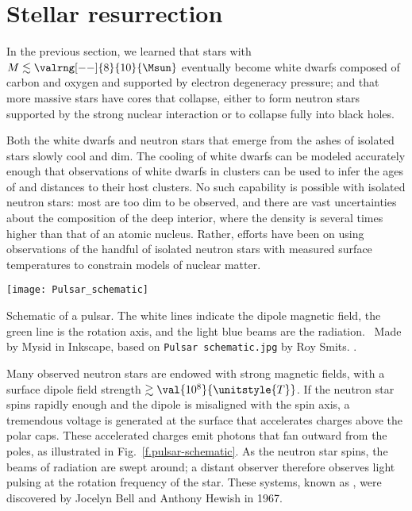 \section{Stellar resurrection}
\label{s.stellar-resurrection}

In the previous section, we learned that stars with $M\lesssim\valrng[--]{8}{10}{\Msun}$ eventually become white dwarfs composed of carbon and oxygen and supported by electron degeneracy pressure; and that more massive stars have cores that collapse, either to form neutron stars supported by the strong nuclear interaction or to collapse fully into black holes.

Both the white dwarfs and neutron stars that emerge from the ashes of isolated stars slowly cool and dim. The cooling of white dwarfs can be modeled accurately enough that observations of white dwarfs in clusters can be used to infer the ages of and distances to their host clusters. No such capability is possible with isolated neutron stars: most are too dim to be observed, and there are vast uncertainties about the composition of the deep interior, where the density is several times higher than that of an atomic nucleus. Rather, efforts have been on using observations of the handful of isolated neutron stars with measured surface temperatures to constrain models of nuclear matter.

\begin{marginfigure}[-10\baselineskip]
\texttt{[image: Pulsar\_schematic]}
\caption[Schematic of a pulsar]{\label{f.pulsar-schematic}
Schematic of a pulsar. The white lines indicate the dipole magnetic field, the green line is the rotation axis, and the light blue beams are the radiation. \imgcred\ Made by Mysid in Inkscape, based on \texttt{Pulsar schematic.jpg} by Roy Smits. \href{https://creativecommons.org/licenses/by-sa/3.0/}{\ccbysa}.}
\end{marginfigure}
Many observed neutron stars are endowed with strong magnetic fields, with a surface dipole field strength $\gtrsim\val{10^{8}}{\unitstyle{T}}$. If the neutron star spins rapidly enough and the dipole is misaligned with the spin axis, a tremendous voltage is generated at the surface that accelerates charges above the polar caps. These accelerated charges emit photons that fan outward from the poles, as illustrated in Fig.~\ref{f.pulsar-schematic}. As the neutron star spins, the beams of radiation are swept around; a distant observer therefore observes light pulsing at the rotation frequency of the star. These systems, known as , were discovered by Jocelyn Bell
and Anthony Hewish in 1967\cite{Hewish1968Observation-of-}.

